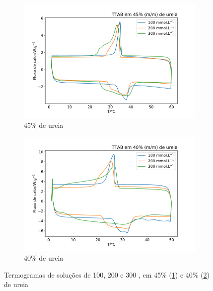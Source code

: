 	\begin{figure}[h]
		\centering
		\begin{subfigure}[t]{0.45\textwidth}
			\includegraphics[width=\textwidth]{./imagens/dsc/TTAB_45p}
			\caption{45\% de ureia}
			\label{fig:DSC_TTAB_UR45}
		\end{subfigure} \qquad %
		\begin{subfigure}[t]{0.45\textwidth}
			\includegraphics[width=\textwidth]{./imagens/dsc/TTAB_40p}
			\caption{40\% de ureia}
			\label{fig:DSC_TTAB_UR40}
		\end{subfigure}
		\caption{Termogramas de soluções de \TTAB{} 100, 200 e 300 \mM{}, em 45\% (\ref{fig:DSC_TTAB_UR45}) e 40\% (\ref{fig:DSC_TTAB_UR40}) de ureia}
		\label{fig:DSC_TTAB_UR_40-45}
	\end{figure}
	
